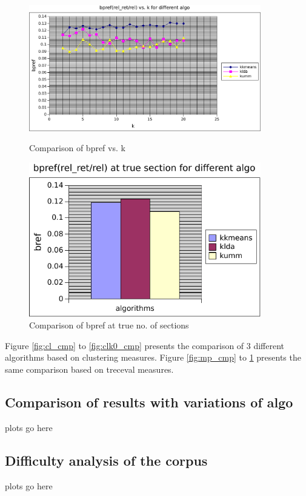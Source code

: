\begin{figure}
\label{fig:bp_cmp}
    \centering
    \begin{minipage}{0.45\textwidth}
        \centering
        \includegraphics[width=0.9\textwidth]{fig/bpref_comp.pdf}
        \caption{Comparison of bpref vs. k}
    \end{minipage}\hfill
    \begin{minipage}{0.45\textwidth}
        \centering
        \includegraphics[width=0.9\textwidth]{fig/bpref_k0_comp.pdf}
        \caption{Comparison of bpref at true no. of sections}
    \end{minipage}
\end{figure}

Figure \ref{fig:cl_cmp} to \ref{fig:clk0_cmp} presents the comparison of 3 different algorithms based on clustering measures. Figure \ref{fig:mp_cmp} to \ref{fig:bp_cmp} presents the same comparison based on treceval measures.
\subsection{Comparison of results with variations of algo} plots go here
\subsection{Difficulty analysis of the corpus} plots go here

